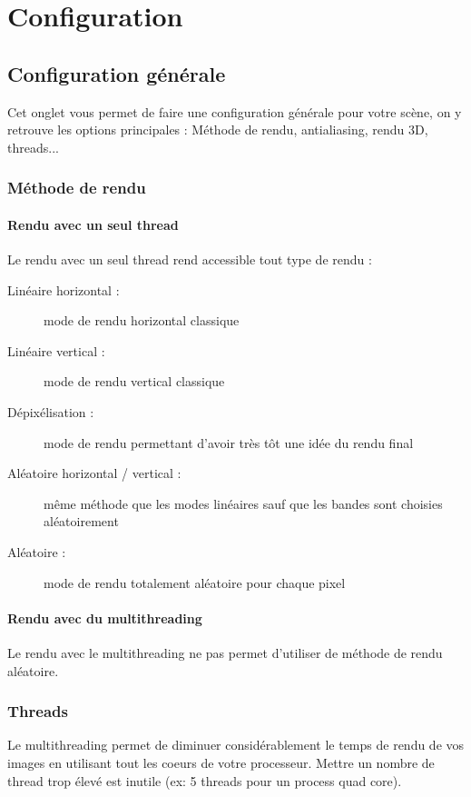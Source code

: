 \documentclass{report}
\begin{document}
\renewcommand{\contentsname}{Sommaire}
\tableofcontents
\part{Configuration}
\chapter{Configuration g\'en\'erale}
Cet onglet vous permet de faire une configuration g\'en\'erale pour votre sc\`ene, on y retrouve les options principales : M\'ethode de rendu, antialiasing, rendu 3D, threads...
\section{M\'ethode de rendu}
\subsection{Rendu avec un seul thread}
Le rendu avec un seul thread rend accessible tout type de rendu :
  \begin{description}
    \item[Lin\'eaire horizontal :] mode de rendu horizontal classique
    \item[Lin\'eaire vertical :] mode de rendu vertical classique
    \item[D\'epix\'elisation :] mode de rendu permettant d'avoir tr\`es t\^ot une id\'ee du rendu final
    \item[Al\'eatoire horizontal / vertical :] m\^eme m\'ethode que les modes lin\'eaires sauf que les bandes sont choisies al\'eatoirement
    \item[Al\'eatoire :] mode de rendu totalement al\'eatoire pour chaque pixel
  \end{description}
\subsection{Rendu avec du multithreading}
Le rendu avec le multithreading ne pas permet d'utiliser de m\'ethode de rendu al\'eatoire.
\section{Threads}
Le multithreading permet de diminuer consid\'erablement le temps de rendu de vos images en utilisant tout les coeurs de votre processeur.
\newline Mettre un nombre de thread trop \'elev\'e est inutile (ex: 5 threads pour un process quad core).
\end{document}
